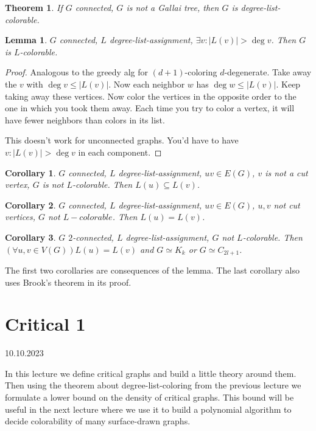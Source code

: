 \documentclass{article}
\newtheorem*{theorem}{Theorem}
\newtheorem*{lemma}{Lemma}
\newtheorem*{corollary}{Corollary}
\begin{document}
\begin{theorem}
	If $G$ connected, $G$ is not a Gallai tree, then $G$ is
	degree-list-colorable.
\end{theorem}

\begin{lemma}
	$G$ connected, $L$ degree-list-assignment, $\exists v: |L(v)| > \deg
	v$. Then $G$ is $L$-colorable.
\end{lemma}
\begin{proof}
	Analogous to the greedy alg for $(d+1)$-coloring $d$-degenerate. Take
	away the $v$ with $\deg v \le |L(v)|$. Now each neighbor $w$ has $\deg
	w \le |L(v)|$. Keep taking away these vertices. Now color the vertices
	in the opposite order to the one in which you took them away. Each time
	you try to color a vertex, it will have fewer neighbors than colors in
	its list.

	This doesn't work for unconnected graphs. You'd have to have $v: |L(v)|
	> \deg v$ in each component.
\end{proof}

\begin{corollary}
	$G$ connected, $L$ degree-list-assignment, $uv \in E(G)$, $v$ is not a
	cut vertex, $G$ is not $L$-colorable. Then $L(u) \subseteq L(v)$.
\end{corollary}

\begin{corollary}
	$G$ connected, $L$ degree-list-assignment, $uv \in E(G)$, $u, v$ not
	cut vertices, $G$ not $L-colorable$. Then $L(u) = L(v)$.
\end{corollary}

\begin{corollary}
	$G$ $2$-connected, $L$ degree-list-assignment, $G$ not $L$-colorable.
	Then $(\forall u, v \in V(G)) L(u) = L(v)$ and $G \simeq K_k$ or $G
	\simeq C_{2l+1}$.
\end{corollary}

\noindent
The first two corollaries are consequences of the lemma. The last corollary
also uses Brook's theorem in its proof.


\newpage
\section{Critical 1} %
10.10.2023

\noindent
In this lecture we define critical graphs and build a little theory around
them. Then using the theorem about degree-list-coloring from the previous
lecture we formulate a lower bound on the density of critical graphs. This
bound will be useful in the next lecture where we use it to build a polynomial
algorithm to decide colorability of many surface-drawn graphs.
\end{document}
